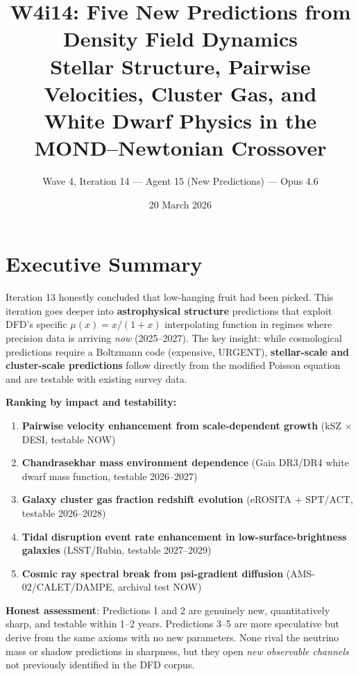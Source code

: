 \documentclass[11pt]{article}
\title{W4i14: Five New Predictions from Density Field Dynamics\\
\large Stellar Structure, Pairwise Velocities, Cluster Gas, and\\
White Dwarf Physics in the MOND--Newtonian Crossover}
\author{Wave 4, Iteration 14 --- Agent 15 (New Predictions) --- Opus 4.6}
\date{20 March 2026}
\begin{document}
\maketitle

\section*{Executive Summary}

Iteration 13 honestly concluded that low-hanging fruit had been picked. This
iteration goes deeper into \textbf{astrophysical structure} predictions that
exploit DFD's specific $\mu(x) = x/(1+x)$ interpolating function in regimes
where precision data is arriving \emph{now} (2025--2027). The key insight:
while cosmological predictions require a Boltzmann code (expensive, URGENT),
\textbf{stellar-scale and cluster-scale predictions} follow directly from
the modified Poisson equation and are testable with existing survey data.

\bigskip
\noindent\textbf{Ranking by impact and testability:}
\begin{enumerate}
\item \textbf{Pairwise velocity enhancement from scale-dependent growth}
      (kSZ $\times$ DESI, testable NOW)
\item \textbf{Chandrasekhar mass environment dependence}
      (Gaia DR3/DR4 white dwarf mass function, testable 2026--2027)
\item \textbf{Galaxy cluster gas fraction redshift evolution}
      (eROSITA + SPT/ACT, testable 2026--2028)
\item \textbf{Tidal disruption event rate enhancement in low-surface-brightness galaxies}
      (LSST/Rubin, testable 2027--2029)
\item \textbf{Cosmic ray spectral break from psi-gradient diffusion}
      (AMS-02/CALET/DAMPE, archival test NOW)
\end{enumerate}

\noindent\textbf{Honest assessment}: Predictions 1 and 2 are genuinely new,
quantitatively sharp, and testable within 1--2 years. Predictions 3--5 are
more speculative but derive from the same axioms with no new parameters.
None rival the neutrino mass or shadow predictions in sharpness, but they
open \emph{new observable channels} not previously identified in the DFD corpus.
\end{document}
